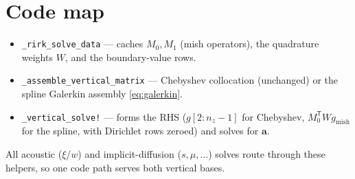 \documentclass[11pt]{article}
\begin{document}
\section{Code map}

\begin{itemize}
  \item \texttt{\_rirk\_solve\_data} --- caches $M_0,M_1$ (mish operators), the
        quadrature weights $W$, and the boundary-value rows.
  \item \texttt{\_assemble\_vertical\_matrix} --- Chebyshev collocation
        (unchanged) or the spline Galerkin assembly \eqref{eq:galerkin}.
  \item \texttt{\_vertical\_solve!} --- forms the RHS ($g[2{:}n_z\!-\!1]$ for
        Chebyshev, $M_0^{\mathsf T}Wg_{\text{mish}}$ for the spline, with
        Dirichlet rows zeroed) and solves for $\mathbf a$.
\end{itemize}
All acoustic ($\xi$/$w$) and implicit-diffusion ($s,\mu,\dots$) solves route
through these helpers, so one code path serves both vertical bases.
\end{document}
